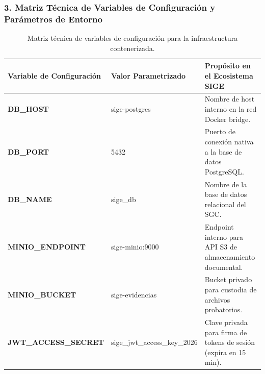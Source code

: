 \documentclass[12pt,a4paper]{article}
\begin{document}
\subsubsection*{3. Matriz Técnica de Variables de Configuración y Parámetros de Entorno}
\begin{table}[H]
\centering
\small
\renewcommand{\arraystretch}{1.2}
\begin{tabularx}{\textwidth}{|>{\hsize=0.8\hsize\raggedright\arraybackslash\bfseries\footnotesize}X|>{\hsize=1.0\hsize\raggedright\arraybackslash\footnotesize}X|>{\hsize=1.2\hsize\raggedright\arraybackslash\footnotesize}X|}
\hline
\rowcolor{tableheader}
\textbf{Variable de Configuración} & \textbf{Valor Parametrizado} & \textbf{Propósito en el Ecosistema SIGE} \\
\hline
DB\_HOST & sige-postgres & Nombre de host interno en la red Docker bridge. \\
\hline
DB\_PORT & 5432 & Puerto de conexión nativa a la base de datos PostgreSQL. \\
\hline
DB\_NAME & sige\_db & Nombre de la base de datos relacional del SGC. \\
\hline
MINIO\_ENDPOINT & sige-minio:9000 & Endpoint interno para API S3 de almacenamiento documental. \\
\hline
MINIO\_BUCKET & sige-evidencias & Bucket privado para custodia de archivos probatorios. \\
\hline
JWT\_ACCESS\_SECRET & sige\_jwt\_access\_key\_2026 & Clave privada para firma de tokens de sesión (expira en 15 min). \\
\hline
\end{tabularx}
\caption{Matriz técnica de variables de configuración para la infraestructura contenerizada.}
\end{table}
\end{document}
